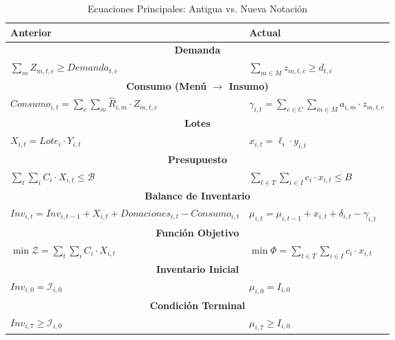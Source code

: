\begin{table}[h]
\centering
\caption{Ecuaciones Principales: Antigua vs. Nueva Notación}
\label{tab:equations-mapping}

\begin{tabular}{|l|l|}
\hline
\textbf{Anterior} & \textbf{Actual} \\
\hline
\multicolumn{2}{|c|}{\textbf{Demanda}} \\
\hline
$\sum_{m} Z_{m,t,c} \ge Demanda_{t,c}$ &
$\sum_{m \in M} z_{m,t,c} \geq d_{t,c}$ \\
\hline
\multicolumn{2}{|c|}{\textbf{Consumo (Menú $\to$ Insumo)}} \\
\hline
$Consumo_{i,t} = \sum_c \sum_m \hat{R}_{i,m} \cdot Z_{m,t,c}$ &
$\gamma_{i,t} = \sum_{c \in C} \sum_{m \in M} a_{i,m} \cdot z_{m,t,c}$ \\
\hline
\multicolumn{2}{|c|}{\textbf{Lotes}} \\
\hline
$X_{i,t} = Lote_i \cdot Y_{i,t}$ &
$x_{i,t} = \ell_i \cdot y_{i,t}$ \\
\hline
\multicolumn{2}{|c|}{\textbf{Presupuesto}} \\
\hline
$\sum_t \sum_i C_i \cdot X_{i,t} \le \mathcal{B}$ &
$\sum_{t \in T} \sum_{i \in I} c_i \cdot x_{i,t} \leq B$ \\
\hline
\multicolumn{2}{|c|}{\textbf{Balance de Inventario}} \\
\hline
$Inv_{i,t} = Inv_{i,t-1} + X_{i,t} + Donaciones_{i,t} - Consumo_{i,t}$ &
$\mu_{i,t} = \mu_{i,t-1} + x_{i,t} + \delta_{i,t} - \gamma_{i,t}$ \\
\hline
\multicolumn{2}{|c|}{\textbf{Función Objetivo}} \\
\hline
$\min \mathcal{Z} = \sum_t \sum_i C_i \cdot X_{i,t}$ &
$\min \Phi = \sum_{t \in T} \sum_{i \in I} c_i \cdot x_{i,t}$ \\
\hline
\multicolumn{2}{|c|}{\textbf{Inventario Inicial}} \\
\hline
$Inv_{i,0} = \mathcal{I}_{i,0}$ &
$\mu_{i,0} = I_{i,0}$ \\
\hline
\multicolumn{2}{|c|}{\textbf{Condición Terminal}} \\
\hline
$Inv_{i,7} \ge \mathcal{I}_{i,0}$ &
$\mu_{i,7} \geq I_{i,0}$ \\
\hline
\end{tabular}
\end{table}

